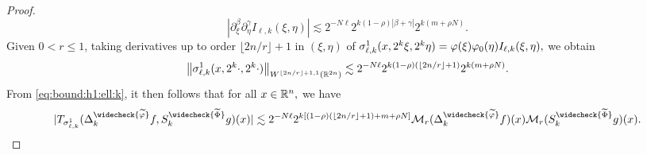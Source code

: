 \begin{proof}
\begin{equation*}
 |\partial_\xi^{\beta} \partial_\eta^{\gamma}  I_{\ell, k}(\xi, \eta)| \lesssim 2^{- N \ell} 2^{k (1-\rho)|\beta+ \gamma|} 2^{k (m+\rho N)}.
\end{equation*}
Given $0< r \le 1$, taking  derivatives up to order $\lfloor{2n/r}\rfloor + 1$ in $(\xi,\eta)$ of
$\sigma^1_{\ell, k}(x, 2^k \xi, 2^k \eta) = \varphi(\xi) \varphi_0(\eta)  I_{\ell, k}(\xi, \eta),$
 we obtain
\begin{align}\label{eq:estsigkl}
  \left\|\sigma^1_{\ell, k}(x, 2^{k} \cdot, 2^{k} \cdot)\right\|_{W^{\lfloor{2n/r}\rfloor + 1,1}(\mathbb{R}^{2n})} \lesssim 2^{- N \ell} 2^{k (1-\rho)( \lfloor{2n/r}\rfloor + 1)} 2^{k (m+\rho N)}.
\end{align}
From \eqref{eq:bound:h1:ell:k}, it then follows that for all $x\in{{\mathbb R}^n},$ we have
\begin{equation*}
|T_{\sigma^1_{\ell,k}}(\Delta^{\widecheck{\widetilde{\f}}}_k f,S^{\widecheck{\widetilde{\Phi}}}_k g)(x)|  \lesssim 2^{- N \ell} 2^{k [(1-\rho)( \lfloor{2n/r}\rfloor + 1)+m+\rho N]}    \mathcal{M}_r(\Delta^{\widecheck{{\widetilde{\f}}}}_k f)(x)\mathcal{M}_r(S^{\widecheck{\widetilde{\Phi}}}_k g)(x).
\end{equation*}


\end{proof}
